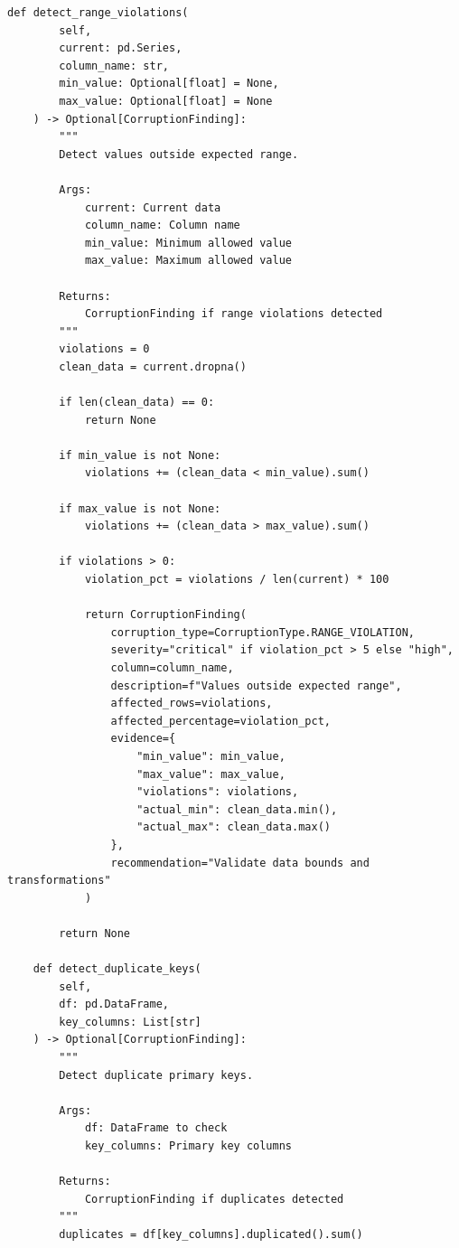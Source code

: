 \begin{lstlisting}[style=python, caption={Data corruption detection framework}]
    def detect_range_violations(
        self,
        current: pd.Series,
        column_name: str,
        min_value: Optional[float] = None,
        max_value: Optional[float] = None
    ) -> Optional[CorruptionFinding]:
        """
        Detect values outside expected range.

        Args:
            current: Current data
            column_name: Column name
            min_value: Minimum allowed value
            max_value: Maximum allowed value

        Returns:
            CorruptionFinding if range violations detected
        """
        violations = 0
        clean_data = current.dropna()

        if len(clean_data) == 0:
            return None

        if min_value is not None:
            violations += (clean_data < min_value).sum()

        if max_value is not None:
            violations += (clean_data > max_value).sum()

        if violations > 0:
            violation_pct = violations / len(current) * 100

            return CorruptionFinding(
                corruption_type=CorruptionType.RANGE_VIOLATION,
                severity="critical" if violation_pct > 5 else "high",
                column=column_name,
                description=f"Values outside expected range",
                affected_rows=violations,
                affected_percentage=violation_pct,
                evidence={
                    "min_value": min_value,
                    "max_value": max_value,
                    "violations": violations,
                    "actual_min": clean_data.min(),
                    "actual_max": clean_data.max()
                },
                recommendation="Validate data bounds and transformations"
            )

        return None

    def detect_duplicate_keys(
        self,
        df: pd.DataFrame,
        key_columns: List[str]
    ) -> Optional[CorruptionFinding]:
        """
        Detect duplicate primary keys.

        Args:
            df: DataFrame to check
            key_columns: Primary key columns

        Returns:
            CorruptionFinding if duplicates detected
        """
        duplicates = df[key_columns].duplicated().sum()


\end{lstlisting}
